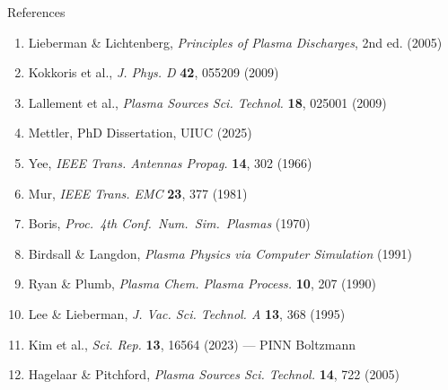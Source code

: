 \documentclass[aspectratio=169,10pt]{beamer}
\begin{document}
\begin{frame}{References}
  \scriptsize
  \begin{enumerate}[]
    \item Lieberman \& Lichtenberg, \textit{Principles of Plasma Discharges}, 2nd ed. (2005)
    \item Kokkoris et al., \textit{J. Phys. D} \textbf{42}, 055209 (2009)
    \item Lallement et al., \textit{Plasma Sources Sci. Technol.} \textbf{18}, 025001 (2009)
    \item Mettler, PhD Dissertation, UIUC (2025)
    \item Yee, \textit{IEEE Trans. Antennas Propag.} \textbf{14}, 302 (1966)
    \item Mur, \textit{IEEE Trans. EMC} \textbf{23}, 377 (1981)
    \item Boris, \textit{Proc.\ 4th Conf.\ Num.\ Sim.\ Plasmas} (1970)
    \item Birdsall \& Langdon, \textit{Plasma Physics via Computer Simulation} (1991)
    \item Ryan \& Plumb, \textit{Plasma Chem. Plasma Process.} \textbf{10}, 207 (1990)
    \item Lee \& Lieberman, \textit{J. Vac. Sci. Technol. A} \textbf{13}, 368 (1995)
    \item Kim et al., \textit{Sci. Rep.} \textbf{13}, 16564 (2023) --- PINN Boltzmann
    \item Hagelaar \& Pitchford, \textit{Plasma Sources Sci. Technol.} \textbf{14}, 722 (2005)
  \end{enumerate}
\end{frame}
\end{document}
